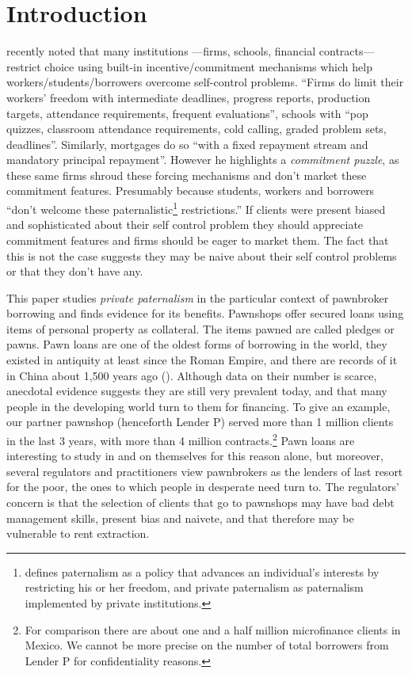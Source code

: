 \documentclass[11pt]{article}
\begin{document}
\section{Introduction}

\cite{Laibson2018} recently noted that many institutions ---firms, schools, financial contracts--- restrict choice using built-in incentive/commitment mechanisms which help workers/students/borrowers overcome self-control problems. ``Firms do limit their workers’ freedom with intermediate deadlines, progress reports, production targets, attendance requirements, frequent evaluations'', schools with ``pop quizzes, classroom attendance requirements, cold calling, graded problem sets, deadlines''. Similarly, mortgages do so ``with a fixed repayment stream and mandatory principal repayment''. However he highlights a \textit{commitment puzzle}, as these same firms shroud these forcing mechanisms and don't market these commitment features. Presumably because students, workers and borrowers ``don't welcome these paternalistic\footnote{\cite{Laibson2018} defines paternalism as a policy that advances an individual’s interests by restricting his or her freedom, and private paternalism as paternalism implemented by private institutions.} restrictions.'' If clients were present biased and  sophisticated about their self control problem they should appreciate commitment features and firms should be eager to market them. The fact that this is not the case suggests they may be naive about their self control problems or that they don't have any. 

This paper studies \textit{private paternalism} in the particular context of pawnbroker borrowing and finds evidence for its benefits. Pawnshops offer secured loans using items of personal property as collateral. The items pawned are called pledges or pawns. Pawn loans are one of the oldest forms of borrowing in the world, they existed in antiquity at least since the Roman Empire, and there are records of it in China about 1,500 years ago (\cite{PawnShops}). Although data on their number is scarce, anecdotal evidence suggests they are still very prevalent today, and that many people in the developing world turn to them for financing. To give an example, our partner pawnshop (henceforth Lender P) served more than 1 million clients in the last 3 years, with more than 4 million contracts.\footnote{For comparison there are about one and a half million microfinance clients in Mexico. We cannot be more precise on the number of total borrowers from Lender P for confidentiality reasons.}  Pawn loans are interesting to study in and on themselves for this reason alone, but moreover, several regulators and practitioners view pawnbrokers as the lenders of last resort for the poor, the ones to which people in desperate need turn to. The regulators' concern is that the selection of clients that go to pawnshops may have bad debt management skills, present bias and naivete, and that therefore may be vulnerable to rent extraction.
\end{document}
